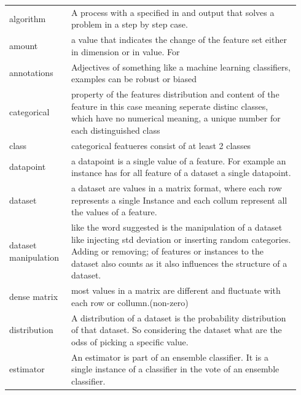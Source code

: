 \documentclass[a4paper,10pt]{article}
\begin{document}
\begin{tabular}{ p{0.20\linewidth} p{0.7437\linewidth} }
	
	
	algorithm & A process with a specified in and output that solves a problem in a step by step case.\\ [1ex]
	
	amount & a value that indicates the change of the feature set either in dimension or in value. For \\[1ex]
	
	
	annotations & Adjectives of something like a machine learning classifiers, examples can be robust or biased\\ [1ex]
	
	categorical & property of the features distribution and content of the feature in this case meaning seperate distinc classes, which have no numerical meaning, a unique number for each distinguished class\\ [1ex]
	
	class	 & categorical featueres consist of at least 2 classes\\ [1ex]
	
	datapoint & a datapoint is a single value of a feature. For example an instance has for all feature of a dataset a single datapoint.\\[1ex]
	
	dataset & a dataset are values in a matrix format, where each row represents a single Instance and each collum represent all the values of a feature.\\ [1ex]
	
	dataset manipulation & like the word suggested is the manipulation of a dataset like injecting std deviation or inserting random categories. Adding or removing; of  features or instances to the dataset also counts as it also influences the structure of a dataset. \\ [1ex]
	
	dense matrix & most values in a matrix are different and fluctuate with each row or collumn.(non-zero)\\ [1ex]
	
	distribution & A distribution of a dataset is the probability distribution of that dataset. So considering the dataset what are the odss of picking a specific value. \\ [1ex]
	
	estimator & An estimator is part of an ensemble classifier. It is a single instance of a classifier in the vote of an ensemble classifier.\\ [1ex]
	

\end{tabular}
\end{document}

